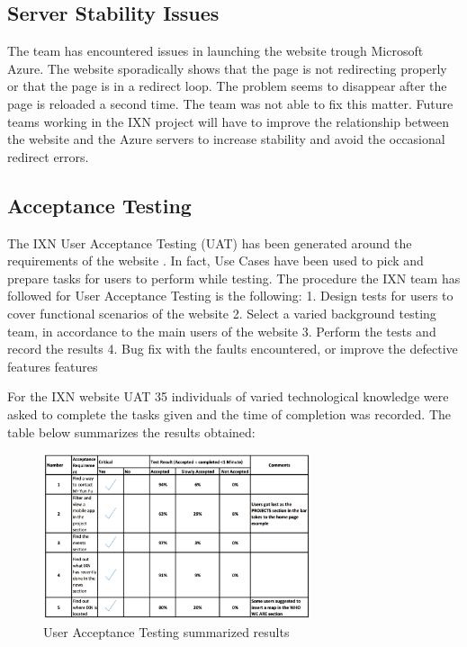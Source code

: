 \documentclass[fontsize=10pt]{extarticle}
\numberwithin{figure}{section} %
\begin{document}
\hypertarget{server-stability-issues}{%
\subsection{Server Stability Issues}\label{server-stability-issues}}

The team has encountered issues in launching the website trough
Microsoft Azure. The website sporadically shows that the page is not
redirecting properly or that the page is in a redirect loop. The problem
seems to disappear after the page is reloaded a second time. The team
was not able to fix this matter. Future teams working in the IXN project
will have to improve the relationship between the website and the Azure
servers to increase stability and avoid the occasional redirect errors.

\hypertarget{acceptance-testing}{%
\subsection{Acceptance Testing}\label{acceptance-testing}}

The IXN User Acceptance Testing (UAT) has been generated around the
requirements of the website \cite{g7} . In fact, Use Cases have been
used to pick and prepare tasks for users to perform while testing. The
procedure the IXN team has followed for User Acceptance Testing is the
following: 1. Design tests for users to cover functional scenarios of
the website 2. Select a varied background testing team, in accordance to
the main users of the website 3. Perform the tests and record the
results 4. Bug fix with the faults encountered, or improve the defective
features features

For the IXN website UAT 35 individuals of varied technological knowledge
were asked to complete the tasks given and the time of completion was
recorded. The table below summarizes the results obtained:

\begin{figure}[H]
      \centering
      \includegraphics[trim = 0 0 0 0, clip, width=0.7\textwidth]{ph4.png}
      \caption{User Acceptance Testing summarized results}
 \end{figure}
\end{document}
